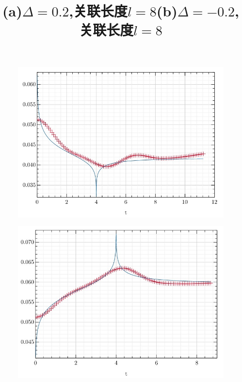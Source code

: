 \documentclass[12pt]{article}
\begin{document}
      \begin{figure}[H]
      	\centering
      	\begin{minipage}{0.49\linewidth}
      		\centering
      		\includegraphics[width=0.9\linewidth]{XXZcor0.2}
      		\title{(a)$\Delta=0.2$,关联长度$l=8$}
      		\label{fig:27}
      	\end{minipage}
      	\begin{minipage}{0.49\linewidth}
      		\centering
      		\includegraphics[width=0.9\linewidth]{XXZcor-0.2}
      		\title{(b)$\Delta=-0.2$,关联长度$l=8$}
      		\label{fig:28}
      	\end{minipage}
        

\end{figure}
\end{document}
